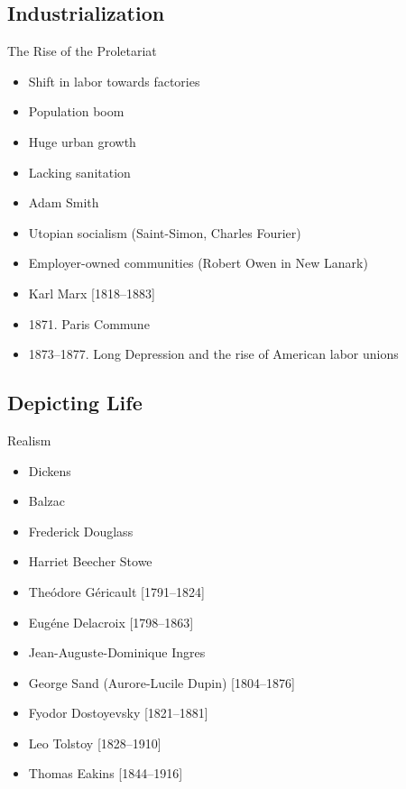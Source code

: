\subsection{Industrialization}
\begin{frame}{The Rise of the Proletariat}
	\begin{itemize}
		\item<1->Shift in labor towards factories
		\item<2->Population boom
		\item<3->Huge urban growth
		\item<4->Lacking sanitation
		\item<1->Adam Smith
		\item<1->Utopian socialism (Saint-Simon, Charles Fourier)
		\item<1->Employer-owned communities (Robert Owen in New Lanark)
		\item<1->Karl Marx [1818--1883]
		\item<1->1871. Paris Commune
		\item<1->1873--1877. Long Depression and the rise of American labor unions
	\end{itemize}
\end{frame}

\subsection{Depicting Life}
\begin{frame}{Realism}
	\begin{itemize}
		\item<1->Dickens
		\item<1->Balzac
		\item<1->Frederick Douglass
		\item<1->Harriet Beecher Stowe
		\item<1->The{\'o}dore G{\'e}ricault [1791--1824]
		\item<1->Eug{\'e}ne Delacroix [1798--1863]
		\item<1->Jean-Auguste-Dominique Ingres 
		\item<2->George Sand (Aurore-Lucile Dupin) [1804--1876]
		\item<2->Fyodor Dostoyevsky [1821--1881]
		\item<2->Leo Tolstoy [1828--1910]
		\item<1->Thomas Eakins [1844--1916]
	\end{itemize}
\end{frame}

